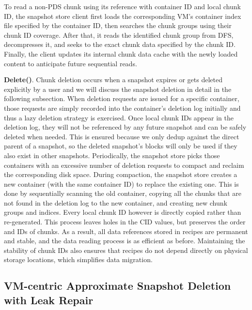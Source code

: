 To read a non-PDS chunk using its reference with container ID and local chunk ID,  the snapshot store client first loads the
corresponding VM's container index file specified by the container ID, then searches the chunk
groups  using their  chunk ID coverage.
After that, it reads the identified chunk group from DFS, decompresses it, and seeks to the exact chunk data 
specified by the chunk ID. 
Finally, the client updates its internal chunk data cache with the newly loaded content to 
anticipate future sequential reads.

\noindent\textbf{Delete()}.
Chunk deletion occurs when a snapshot expires or gets deleted explicitly by a user
and we will discuss the snapshot deletion in detail in the following subsection.
When deletion requests are issued for a specific container,
those requests are simply recorded into the  container's deletion log initially and thus  a lazy
deletion strategy is exercised.
Once local chunk IDs appear in
the deletion log, they will not be referenced by any future snapshot and can be safely deleted when needed. 
This is ensured because we only dedup against the direct parent of a snapshot, so the deleted snapshot's blocks
will only be used if they also exist in other snapshots.
Periodically, the snapshot  store picks those containers with an excessive
number of deletion requests to  compact and  reclaim the corresponding disk space. 
During compaction, the snapshot store creates a new container (with the same container ID) to replace the 
existing one. This is done by sequentially scanning the old container, copying all the chunks that are not 
found in the deletion log to the new container, and creating new chunk groups and indices. 
Every local chunk ID however is directly copied rather than re-generated. This
process leaves holes in the CID values, but preserves the order and IDs of chunks.
As a result, all data references stored 
in recipes are permanent and stable, and the data reading process
is as efficient as before. Maintaining the stability of chunk IDs also ensures that recipes do not
depend directly on physical storage locations, which simplifies data migration.


\subsection{ VM-centric Approximate Snapshot Deletion with Leak Repair}
\label{sect:delete}

